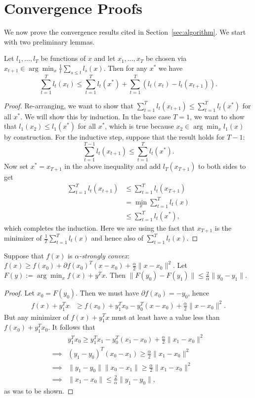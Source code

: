 \documentclass{article}
\begin{document}
\section{Convergence Proofs}
\label{sec:proofs}
We now prove the convergence results cited in Section~\ref{sec:algorithm}. 
We start with two preliminary lemmas.
\begin{lemma}
\label{lem:ftl}
Let $l_1,\ldots,l_T$ be functions of $x$ and let $x_1,\ldots,x_T$ 
be chosen via $x_{t+1} \in \arg\min_{x} \frac{1}{t} \sum_{s \leq t} l_s(x)$. 
Then for any $x^*$ we have
\[ \sum_{t=1}^T l_t(x_t) \leq \sum_{t=1}^T l_t(x^*) + \sum_{t=1}^T (l_t(x_t) - l_t(x_{t+1})). \]
\end{lemma}
\begin{proof}
Re-arranging, we want to show that $\sum_{t=1}^T l_t(x_{t+1}) \leq \sum_{t=1}^T l_t(x^*)$ for 
all $x^*$. We will show this by induction. In the base case $T=1$, we want to show that $l_1(x_2) \leq l_1(x^*)$ 
for all $x^*$, which is true because $x_2 \in \arg\min_x l_1(x)$ by construction. For 
the inductive step, suppose that the result holds for $T-1$:
\[ \sum_{t=1}^{T-1} l_t(x_{t+1}) \leq \sum_{t=1}^T l_t(x^*). \]
Now set $x^* = x_{T+1}$ in the above inequality and 
add $l_T(x_{T+1})$ to both sides to get
\begin{align*}
\sum_{t=1}^T l_t(x_{t+1}) &\leq \sum_{t=1}^T l_t(x_{T+1}) \\
 &= \min_{x} \sum_{t=1}^T l_t(x) \\
 &\leq \sum_{t=1}^T l_t(x^*),
\end{align*}
which completes the induction. Here we are using the fact that $x_{T+1}$ 
is the minimizer of $\frac{1}{T} \sum_{t=1}^T l_t(x)$ and hence also of 
$\sum_{t=1}^T l_t(x)$.
\end{proof}
\begin{lemma}
\label{lem:convexity}
Suppose that $f(x)$ is \emph{$\alpha$-strongly convex}: $f(x) \geq f(x_0) + \partial f(x_0)^T(x-x_0) + \frac{\alpha}{2}\|x-x_0\|^2$. 
Let $F(y) := \arg\min_x f(x) + y^Tx$. Then $\|F(y_0)-F(y_1)\| \leq \frac{2}{\alpha} \|y_0-y_1\|$.
\end{lemma}
\begin{proof}
Let $x_0 = F(y_0)$. Then we must have $\partial f(x_0) = -y_0$, hence 
\begin{align*}
f(x)+y_1^Tx &\geq f(x_0) + y_1^Tx_0 - y_0^T(x-x_0) + \frac{\alpha}{2}\|x-x_0\|^2.
\end{align*}
But any minimizer of $f(x) + y_1^Tx$ must at least have a value less than $f(x_0) + y_1^Tx_0$. 
It follows that 
\begin{align*}
         & y_1^Tx_0 \geq y_1^Tx_1 - y_0^T(x_1-x_0) + \frac{\alpha}{2}\|x_1-x_0\|^2 \\
\implies & (y_1-y_0)^T(x_0-x_1) \geq \frac{\alpha}{2}\|x_1-x_0\|^2 \\
\implies & \|y_1-y_0\|\|x_0-x_1\| \geq \frac{\alpha}{2}\|x_1-x_0\|^2 \\
\implies & \|x_1-x_0\| \leq \frac{2}{\alpha} \|y_1-y_0\|,
\end{align*}
as was to be shown.
\end{proof}
\end{document}
